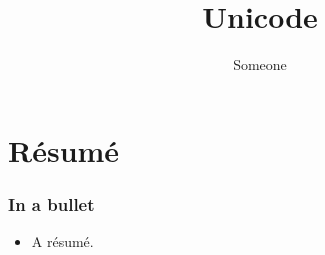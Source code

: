 \documentclass[t]{beamer}
\begin{document}
\title[Unicode]{Unicode%
  \label{unicode}}
\author[Someone, Someone]{Someone}
\date{}
\maketitle


\section{Résumé%
  \label{resume}%
}

\begin{frame}[fragile]
\frametitle{In a bullet}

\begin{itemize}[<+-| alert@+>]

\item A résumé.
\end{itemize}

\end{frame}
\end{document}
